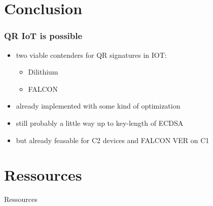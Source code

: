 \documentclass[ucs,10pt]{beamer}
\begin{document}
\section{Conclusion}
\begin{frame}
  \frametitle{QR IoT is possible}
  \begin{itemize}
    \item two viable contenders for QR signatures in IOT:
    \begin{itemize}
      \item Dilithium
      \item FALCON
    \end{itemize}
    \item already implemented with some kind of optimization
    \item still probably a little way up to key-length of ECDSA
    \item but already feasable for C2 devices and FALCON VER on C1
  \end{itemize}
  

\end{frame}

\section{Ressources}
\begin{frame}[allowframebreaks]{Ressources}
  \nocite{*}
  
  
\end{frame}
\end{document}
